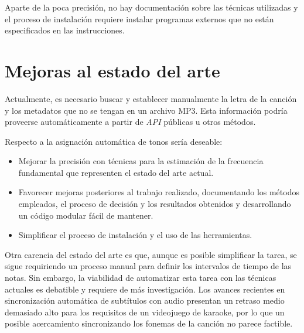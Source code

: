 Aparte de la poca precisión, no hay documentación sobre las técnicas utilizadas y el proceso de instalación requiere instalar programas externos que no están especificados en las instrucciones.


\section{Mejoras al estado del arte}

Actualmente, es necesario buscar y establecer manualmente la letra de la canción y los metadatos que no se tengan en un archivo MP3. Esta información podría proveerse automáticamente a partir de \textit{API} públicas u otros métodos.

Respecto a la asignación automática de tonos sería deseable:

\begin{itemize}
	\item{Mejorar la precisión con técnicas para la estimación de la frecuencia fundamental que representen el estado del arte actual.}
	\item{Favorecer mejoras posteriores al trabajo realizado, documentando los métodos empleados, el proceso de decisión y los resultados obtenidos y desarrollando un código modular fácil de mantener.}
	\item{Simplificar el proceso de instalación y el uso de las herramientas.}
\end{itemize}

Otra carencia del estado del arte es que, aunque es posible simplificar la tarea, se sigue requiriendo un proceso manual para definir los intervalos de tiempo de las notas. Sin embargo, la viabilidad de automatizar esta tarea con las técnicas actuales es debatible y requiere de más investigación. Los avances recientes en sincronización automática de subtítulos con audio \cite{Sub-Sync, Deep-Sync} presentan un retraso medio demasiado alto para los requisitos de un videojuego de karaoke, por lo que un posible acercamiento sincronizando los fonemas de la canción no parece factible.